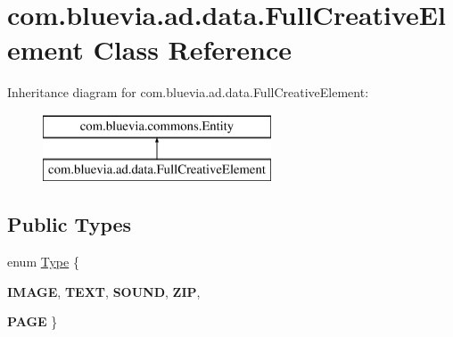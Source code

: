 \hypertarget{classcom_1_1bluevia_1_1ad_1_1data_1_1FullCreativeElement}{
\section{com.bluevia.ad.data.FullCreativeElement Class Reference}
\label{classcom_1_1bluevia_1_1ad_1_1data_1_1FullCreativeElement}
}
Inheritance diagram for com.bluevia.ad.data.FullCreativeElement:\begin{figure}[H]
\begin{center}
\leavevmode
\includegraphics[height=2.000000cm]{classcom_1_1bluevia_1_1ad_1_1data_1_1FullCreativeElement}
\end{center}
\end{figure}
\subsection*{Public Types}
\begin{DoxyCompactItemize}
\item 
enum \hyperlink{classcom_1_1bluevia_1_1ad_1_1data_1_1FullCreativeElement_a1a64b29ff50d01119bbaf6fee4e3f4f4}{Type} \{ \par
{\bfseries IMAGE}, 
{\bfseries TEXT}, 
{\bfseries SOUND}, 
{\bfseries ZIP}, 
\par
{\bfseries PAGE}
 \}
\end{DoxyCompactItemize}
